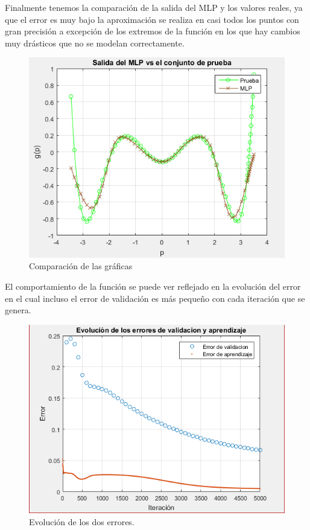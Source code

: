Finalmente tenemos la comparación de la salida del MLP y los valores reales, ya que el error es muy bajo la aproximación se realiza en casi todos los puntos con gran precisión a excepción de los extremos de la función en los que hay cambios muy drásticos que no se modelan correctamente.
\begin{figure}[H]
    \begin{center}
        \includegraphics[width=12cm]{3/prueba.png}
        \caption{Comparación de las gráficas}
        \label{fig:prueba3}
    \end{center}
\end{figure}
El comportamiento de la función se puede ver reflejado en la evolución del error en el cual incluso el error de validación es más pequeño con cada iteración que se genera.
\begin{figure}[H]
    \begin{center}
        \includegraphics[width=14cm]{3/error.png}
        \caption{Evolución de los dos errores.}
        \label{fig:error3}
    \end{center}
\end{figure}
